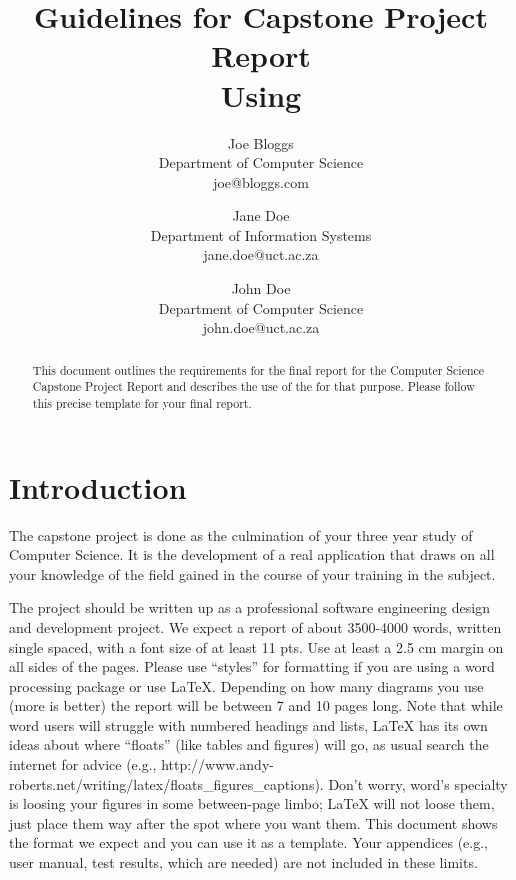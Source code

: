 \documentclass[11pt,a4paper]{article}
\begin{document}
\title{Guidelines for Capstone Project Report\\Using \LaTeXe} \date{}
\author{Joe Bloggs\\Department of Computer Science\\joe@bloggs.com
\and Jane Doe\\Department of Information Systems\\jane.doe@uct.ac.za
\and John Doe\\Department of Computer Science\\john.doe@uct.ac.za}

\chead{}
\lfoot{}
\cfoot{\thepage}    %
\rfoot{}
\renewcommand{\headrulewidth}{0.0pt}   %

\maketitle
\thispagestyle{plain}  %

\begin{abstract}
  This document outlines the requirements for the final report for the
  Computer Science Capstone Project Report and describes the use of
  the \LaTeXe for that purpose. Please follow this precise template
  for your final report.
\end{abstract}

\section{Introduction}
The capstone project is done as the culmination of your three year
study of Computer Science. It is the development of a real application
that draws on all your knowledge of the field gained in the course of
your training in the subject.

The project should be written up as a professional software
engineering design and development project. We expect a report of
about 3500-4000 words, written single spaced, with a font size of at
least 11 pts. Use at least a 2.5 cm margin on all sides of the
pages. Please use ``styles'' for formatting if you are using a word
processing package or use \LaTeX. Depending on how many diagrams you
use (more is better) the report will be between 7 and 10 pages
long. Note that while word users will struggle with numbered headings
and lists, \LaTeX\/ has its own ideas about where ``floats'' (like
tables and figures) will go, as usual search the internet for advice
(e.g.,
http://www.andy-roberts.net/writing/latex/floats\_figures\_captions). Don't
worry, word's specialty is loosing your figures in some between-page
limbo; \LaTeX\/ will not loose them, just place them way after the spot
where you want them.
This document shows the format we expect and you can use it as a
template.  Your appendices (e.g., user manual, test results, which are
needed) are not included in these limits.
\end{document}

